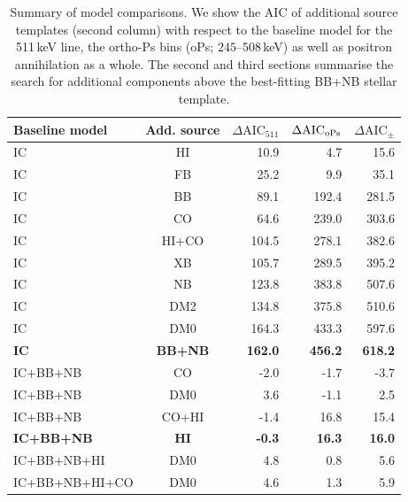 \documentclass[doublespace,nopageskip]{VTthesis}
\begin{document}
\begin{table}[htb]
	\centering
	\caption{Summary of model comparisons. We show the AIC of additional source templates (second column) with respect to the baseline model for the 511\,keV line, the ortho-Ps bins (oPs; $245$--$508$\,keV) as well as positron annihilation as a whole. The second and third sections summarise the search for additional components above the best-fitting BB+NB stellar template.}
	\begin{tabular}{lcrrr}
		\toprule
		Baseline model & Add. source & $\Delta\mathrm{AIC}_{511}$ & $\Delta\mathrm{AIC}_{\rm oPs}$ & $\Delta\mathrm{AIC}_{\pm}$ \\
		\midrule
		{IC} & {HI} & 10.9 & 4.7 & 15.6  \\
		{IC} & {FB} & 25.2 & 9.9 & 35.1  \\
		{IC} & {BB} & 89.1 & 192.4 & 281.5  \\
		{IC} & {CO} & 64.6 & 239.0 & 303.6  \\
		{IC} & {HI+CO} & 104.5 & 278.1 & 382.6  \\
		{IC} & {XB} & 105.7 & 289.5 &  395.2  \\
		{IC} & {NB} & 123.8 & 383.8 & 507.6  \\
		{IC} & {DM2} & 134.8 & 375.8 & 510.6  \\
		{IC} & {DM0} & 164.3 & 433.3 & 597.6  \\
		\textbf{{IC}} & \textbf{{BB+NB}} & \textbf{162.0} & \textbf{456.2} & \textbf{618.2} \\
		\midrule
		{IC+BB+NB} & {CO} & -2.0 & -1.7 & -3.7  \\
		{IC+BB+NB} & {DM0} & 3.6 & -1.1 & 2.5  \\
		{IC+BB+NB} & {CO+HI} & -1.4 & 16.8 & 15.4  \\
		\textbf{{IC+BB+NB}} & \textbf{{HI}} & \textbf{-0.3} & \textbf{16.3} & \textbf{16.0}  \\
		\midrule
		{IC+BB+NB+HI} & {DM0} & 4.8 & 0.8 & 5.6  \\
		{IC+BB+NB+HI+CO} & {DM0} & 4.6 & 1.3 & 5.9  \\
		\bottomrule
		\end{tabular}
	\label{tab:AIC_results}
\end{table}
\end{document}
